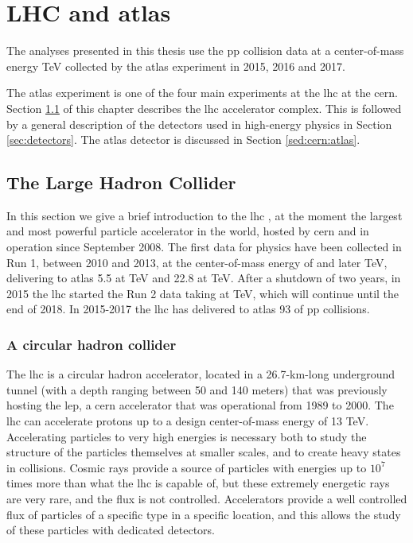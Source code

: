 \chapter{LHC and \gls{atlas}}
\label{chap:cern}

The analyses presented in this thesis use the \gls{pp} collision data at a center-of-mass energy \cmtre TeV 
collected by the \gls{atlas} experiment in 2015, 2016 and 2017. 

The \gls{atlas} experiment is one of the four main experiments at the \gls{lhc} at the \gls{cern}. Section \ref{sed:cern:lhc} of this chapter describes the \gls{lhc} accelerator complex. This is followed by a general description of the detectors used in high-energy physics in Section \ref{sec:detectors}. The \gls{atlas} detector is discussed in Section \ref{sed:cern:atlas}.


\section{The Large Hadron Collider}
\label{sed:cern:lhc}

In this section we give a brief introduction to the \gls{lhc} \cite{1748-0221-3-08-S08001}, at the moment the largest and most powerful particle accelerator in the world, hosted by \gls{cern} and in operation since September 2008.
The first data for physics have been collected in Run 1, between 2010 and 2013, at the center-of-mass energy of \cmsette and later 
\cmotto TeV, delivering to \gls{atlas} 5.5 \ifb at \cmsette TeV and 22.8 \ifb at \cmotto TeV.
After a shutdown of two years, in 2015 the \gls{lhc} started the Run 2 data taking at \cmtre TeV, which will continue until the end of 2018. 
In 2015-2017 the \gls{lhc} has delivered to \gls{atlas} 93 \ifb of \gls{pp} collisions. 

\subsection{A circular hadron collider}

The \gls{lhc} is a circular hadron accelerator, located in a 26.7-km-long underground tunnel (with a depth ranging between 50 and 140 meters) that was previously hosting the \gls{lep}, a \gls{cern} accelerator that was operational from 1989 to 2000. The \gls{lhc} can accelerate protons up to a design center-of-mass energy of 13 TeV. Accelerating particles to very high energies is necessary both to study the structure of the particles themselves at smaller scales, and to create heavy states in collisions. Cosmic rays provide a source of particles with energies up to $10^7$ times more than what the \gls{lhc} is capable of, but these extremely energetic rays are very rare, and the flux is not controlled. Accelerators provide a well controlled flux of particles of a specific type in a specific location, and this allows the study of these particles with dedicated detectors.

